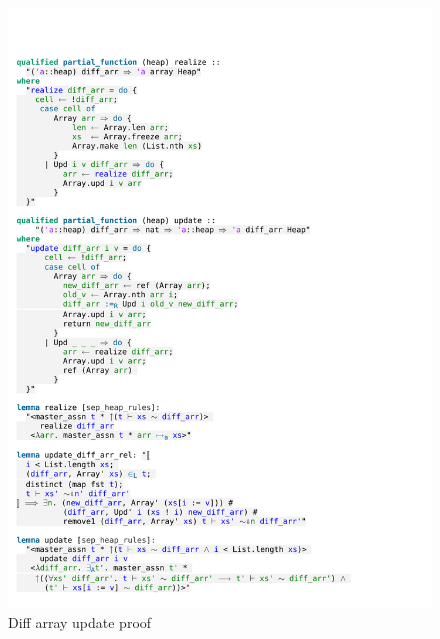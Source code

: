 \begin{figure}[htpb]
    \includegraphics[trim={0 0,7cm 0 26,2cm}, clip, width=1.00\textwidth]{figures/Theory_Diff_Arr_Update.pdf}
    \caption[Diff array update proof]{Diff array update proof}
    \label{fig:diff_arr_update_proof}
\end{figure}

